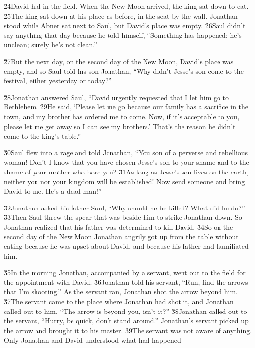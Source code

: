 \v{24}David hid in the field. When the New Moon arrived, the king sat down to eat. \v{25}The king sat down at his place as before, in the seat by the wall. Jonathan stood while Abner sat next to Saul, but David's place was empty. \v{26}Saul didn't say anything that day because he told himself, ``Something has happened; he's unclean; surely he's not clean.''

\v{27}But the next day, on the second day of the New Moon, David's place was empty, and so Saul told his son Jonathan, ``Why didn't Jesse's son come to the festival, either yesterday or today?''

\v{28}Jonathan answered Saul, ``David urgently requested that I let him go to Bethlehem. \v{29}He said, `Please let me go because our family has a sacrifice in the town, and my brother has ordered me to come. Now, if it's acceptable to you, please let me get away so I can see my brothers.' That's the reason he didn't come to the king's table.''

\v{30}Saul flew into a rage and told Jonathan, ``You son of a perverse and rebellious woman! Don't I know that you have chosen Jesse's son to your shame and to the shame of your mother who bore you? \v{31}As long as Jesse's son lives on the earth, neither you nor your kingdom will be established! Now send someone and bring David to me. He's a dead man!''

\v{32}Jonathan asked his father Saul, ``Why should he be killed? What did he do?'' \v{33}Then Saul threw the spear that was beside him to strike Jonathan down. So Jonathan realized that his father was determined to kill David. \v{34}So on the second day of the New Moon Jonathan angrily got up from the table without eating because he was upset about David, and because his father had humiliated him.

\v{35}In the morning Jonathan, accompanied by a servant, went out to the field for the appointment with David. \v{36}Jonathan told his servant, ``Run, find the arrows that I'm shooting.'' As the servant ran, Jonathan shot the arrow beyond him. \v{37}The servant came to the place where Jonathan had shot it, and Jonathan called out to him, ``The arrow is beyond you, isn't it?'' \v{38}Jonathan called out to the servant, ``Hurry, be quick, don't stand around.'' Jonathan's servant picked up the arrow and brought it to his master. \v{39}The servant was not aware of anything. Only Jonathan and David understood what had happened.

